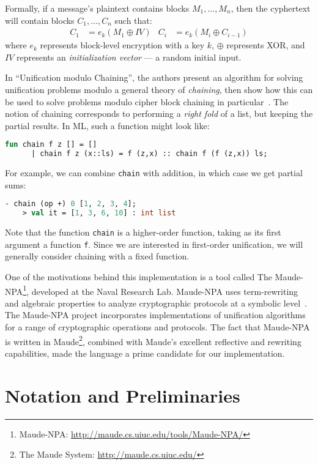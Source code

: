 \documentclass[11pt]{article}
\begin{document}
Formally, if a message's plaintext contains blocks $M_1, \dotsc, M_n$, then
the cyphertext will contain blocks $C_1, \dotsc, C_n$ such that:
\begin{align*}
    C_1 &= e_k(M_1 \oplus IV) &
    C_i &= e_k(M_i \oplus C_{i-1})
\end{align*}
where $e_k$ represents block-level encryption with a key $k$, $\oplus$
represents XOR, and $IV$ represents an \emph{initialization vector} --- a
random initial input.

In ``Unification modulo Chaining'', the authors present an algorithm for
solving unification problems modulo a general theory of \emph{chaining}, then
show how this can be used to solve problems modulo cipher block chaining in
particular~\cite{anantharaman2012unification}. The notion of chaining
corresponds to performing a \emph{right fold} of a list, but keeping the
partial results.  In ML, such a function might look like:
\begin{lstlisting}[language=ML, style=smalllisting]
    fun chain f z [] = []
      | chain f z (x::ls) = f (z,x) :: chain f (f (z,x)) ls;
\end{lstlisting}
For example, we can combine \lstinline|chain| with addition, in which case we
get partial sums:
\begin{lstlisting}[language=ML, style=smalllisting]
    - chain (op +) 0 [1, 2, 3, 4];
    > val it = [1, 3, 6, 10] : int list
\end{lstlisting}
Note that the function \lstinline|chain| is a higher-order function, taking as
its first argument a function \lstinline|f|. Since we are interested in
first-order unification, we will generally consider chaining with a fixed
function.

One of the motivations behind this implementation is a tool called The
Maude-NPA\footnote{Maude-NPA: \url{http://maude.cs.uiuc.edu/tools/Maude-NPA/}},
developed at the Naval Research Lab. Maude-NPA uses term-rewriting and
algebraic properties to analyze cryptographic protocols at a symbolic
level~\cite{escobar2009maude}.  The Maude-NPA project incorporates
implementations of unification algorithms for a range of cryptographic
operations and protocols. The fact that Maude-NPA is written in
Maude\footnote{The Maude System: \url{http://maude.cs.uiuc.edu/}}, combined
with Maude's excellent reflective and rewriting capabilities, made the language
a prime candidate for our implementation.

\section{Notation and Preliminaries}\label{section:notation}
\end{document}
